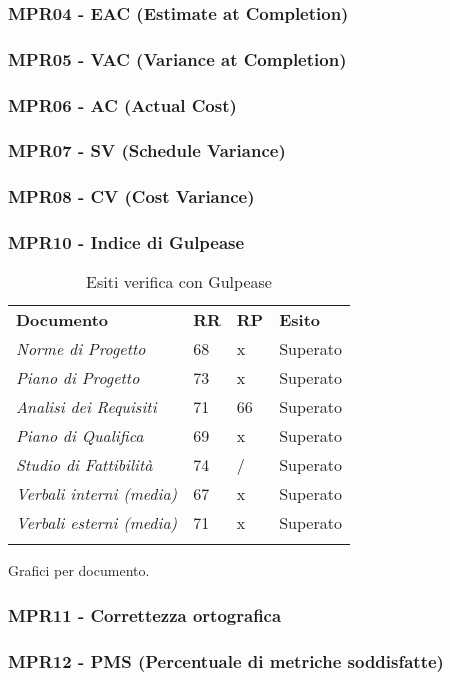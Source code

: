 \subsubsection{MPR04 - EAC (Estimate at Completion)}
\subsubsection{MPR05 - VAC (Variance at Completion)}
\subsubsection{MPR06 - AC (Actual Cost)}
\subsubsection{MPR07 - SV (Schedule Variance)}
\subsubsection{MPR08 - CV (Cost Variance)}
\subsubsection{MPR10 - Indice di Gulpease}
\begin{center}
    \centering
    \renewcommand{\arraystretch}{1.8}
    \label{tab:IndiciGulpease}
    \begin{longtable}[!h]{p{150px} p{50px} p{50px} p{50px}}
        \caption{Esiti verifica con Gulpease}                                                \\
        \rowcolor{logo!70}   \textbf{Documento} & \textbf{RR} & \textbf{RP} & \textbf{Esito} \\
        \textit{Norme di Progetto}              & 68          & x           & Superato       \\
        \textit{Piano di Progetto}              & 73          & x           & Superato       \\
        \textit{Analisi dei Requisiti}          & 71          & 66          & Superato       \\
        \textit{Piano di Qualifica}             & 69          & x           & Superato       \\
        \textit{Studio di Fattibilità}          & 74          & /           & Superato       \\
        \textit{Verbali interni (media)}        & 67          & x           & Superato       \\
        \textit{Verbali esterni (media)}        & 71          & x           & Superato       \\
        \rowcolor{white}
    \end{longtable}
\end{center}
Grafici per documento.
\subsubsection{MPR11 - Correttezza ortografica}
\subsubsection{MPR12 - PMS (Percentuale di metriche soddisfatte)}
\newpage